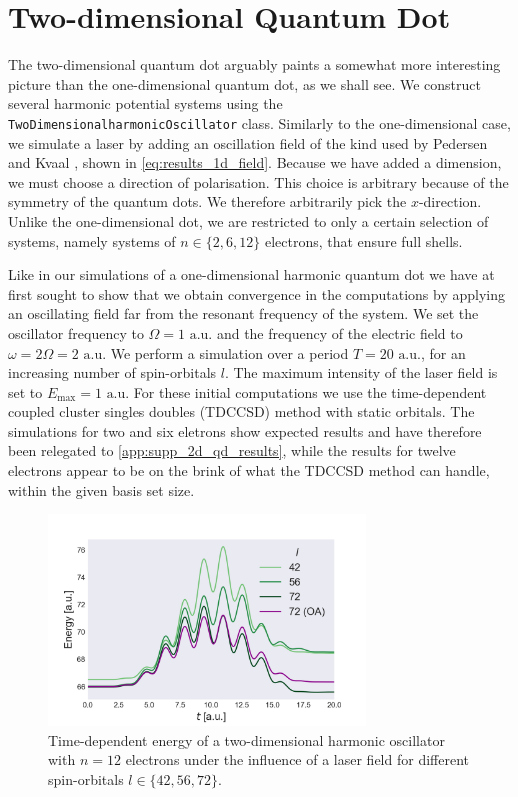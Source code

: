 \section{Two-dimensional Quantum Dot}

The two-dimensional quantum dot arguably paints a somewhat more interesting picture 
than the one-dimensional quantum dot, as we shall see. We construct several 
harmonic potential systems using the  \lstinline{TwoDimensionalharmonicOscillator} class.
Similarly to the one-dimensional case, we simulate a laser by adding an 
oscillation field of the kind used by
Pedersen and Kvaal \cite{pedersen2019symplectic}, shown 
in \autoref{eq:results_1d_field}. Because we have added a dimension, we must 
choose a direction of polarisation. This choice is arbitrary because of the 
symmetry of the quantum dots. We therefore arbitrarily pick the $x$-direction.
Unlike the one-dimensional dot, we are restricted to only a certain selection of 
systems, namely systems of $n\in\{2,6,12\}$ electrons, that ensure full shells.

Like in our simulations of a one-dimensional harmonic quantum dot we have at first 
sought to show that we obtain convergence in the computations by applying an oscillating 
field far from the resonant frequency of the system. We set the oscillator frequency 
to $\Omega=1 \text{ a.u.}$ and the frequency of the electric field to $\omega=2\Omega=2 \text{ a.u.}$
We 
perform a simulation over a period $T = 20 \text{ a.u.}$, for an increasing 
number of spin-orbitals $l$. The maximum intensity of the laser field is set to 
$E_\text{max} = 1 \text{ a.u.}$ For these initial computations we use the 
time-dependent coupled cluster singles doubles (TDCCSD) method with static 
orbitals. The simulations for two and six eletrons show expected results and have
therefore been relegated to \autoref{app:supp_2d_qd_results}, while the results for
twelve electrons appear to be on the brink of what the TDCCSD method 
can handle, within the given basis set size.

\begin{figure}
    \centering
    \includegraphics[width=0.75\textwidth]{results/figures/2D/n12_energy.png} 
    \caption{Time-dependent energy of a two-dimensional harmonic oscillator 
        with $n=12$ electrons under the influence of a laser field for different 
        spin-orbitals $l\in\{42,56,72\}$.
    }
    \label{fig:n12_2d_energy}
\end{figure}

